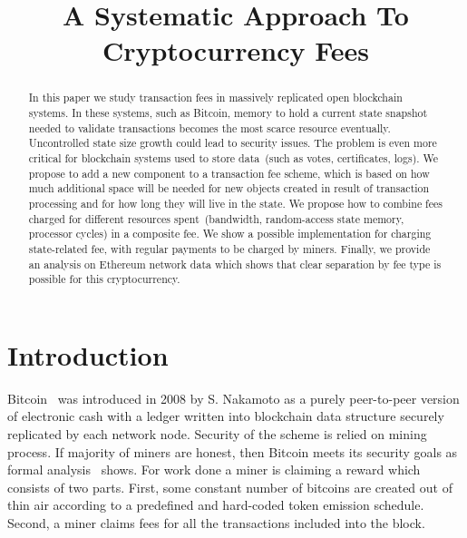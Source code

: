 \documentclass[]{llncs}   %
\newcommand{\authnote}[2]{\marginpar{\parbox{\marginparwidth}{\tiny %
  \textsf{#1 {\textcolor{blue}{notes: #2}}}}}%
  \textcolor{blue}{\textbf{\dag}}}
\newcommand{\authnote}[2]{
  \textsf{#1\textcolor{blue}{ #2}}}
\newcommand{\authnote}[2]{}
\newcommand{\knote}[1]{{\authnote{\textcolor{green}{Alex notes:}}{#1}}}
\begin{document}
\title{A Systematic Approach To Cryptocurrency Fees}


\maketitle

\begin{abstract}

In this paper we study transaction fees in massively replicated open
blockchain systems. In these systems, such as Bitcoin, memory to hold a current
state snapshot needed to validate transactions becomes the most scarce resource
eventually. Uncontrolled state size growth could lead
to security issues. 
The problem is even more critical for blockchain systems used to store
data~(such as votes, certificates, logs). We propose to add a new component to a transaction fee scheme, which is based on
how much additional space will be needed for new objects created in result of
transaction processing and for how long they will live in the state. We propose how to 
combine fees charged for different resources spent~(bandwidth, random-access state memory, processor cycles) 
in a composite fee. We show a possible implementation for charging state-related fee, with regular payments to be charged by miners.
Finally, we provide an analysis on Ethereum network data which shows that clear separation by fee type is possible for this cryptocurrency.


\end{abstract}

\section{Introduction}

Bitcoin~\cite{Nakamoto2008} was introduced in 2008 by S. Nakamoto as a purely
peer-to-peer version of electronic cash with a ledger written into blockchain
data structure securely replicated by each network node. Security of the scheme
is relied on mining process. If majority of miners are honest, then Bitcoin
meets its security goals as formal analysis~\cite{Garay2015} shows. For work
done a miner is claiming a reward which consists of two parts. First, some
constant number of bitcoins are created out of thin air according to a
predefined and hard-coded token emission schedule. Second, a miner claims fees
for all the transactions included into the block.
\end{document}
